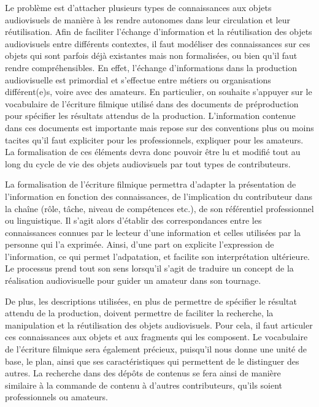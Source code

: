  Le problème est d'attacher plusieurs types de connaissances aux objets audiovisuels de manière à les rendre autonomes dans leur circulation et leur réutilisation. 
Afin de faciliter l'échange d'information et la réutilisation des objets audiovisuels entre différents contextes, il faut modéliser des connaissances sur ces objets qui sont parfois déjà existantes mais non formalisées, ou bien qu'il faut rendre compréhensibles.
En effet, l'échange d'informations dans la production audiovisuelle est primordial et s'effectue entre métiers ou organisations différent(e)s, voire avec des amateurs. 
En particulier, on souhaite s'appuyer sur le vocabulaire de l'écriture filmique utilisé dans des documents de préproduction pour spécifier les résultats attendus de la production.
L'information contenue dans ces documents est importante mais repose sur des conventions plus ou moins tacites qu'il faut expliciter pour les professionnels, expliquer pour les amateurs.
La formalisation de ces éléments devra donc pouvoir être lu et modifié tout au long du cycle de vie des objets audiovisuels par tout types de contributeurs.

La formalisation de l'écriture filmique permettra d'adapter la présentation de l'information en fonction des connaissances, de l'implication du contributeur dans la chaîne (rôle, tâche, niveau de compétences etc.), de son référentiel professionnel ou linguistique. 
Il s'agit alors d'établir des correspondances entre les connaissances connues par le lecteur d'une information et celles utilisées par la personne qui l'a exprimée.
Ainsi, d'une part on explicite l'expression de l'information, ce qui permet l'adpatation, et facilite son interprétation ultérieure.
Le processus prend tout son sens lorsqu'il s'agit de traduire un concept de la réalisation audiovisuelle pour guider un amateur dans son tournage.


De plus, les descriptions utilisées, en plus de permettre de spécifier le résultat attendu de la production, doivent permettre de faciliter la recherche, la manipulation et la réutilisation des objets audiovisuels.
Pour cela, il faut articuler ces connaissances aux objets et aux fragments qui les composent. 
Le vocabulaire de l'écriture filmique sera également précieux, puisqu'il nous donne une unité de base, le plan, ainsi que ses caractéristiques qui permettent de le distinguer des autres. 
La recherche dans des dépôts de contenus se fera ainsi de manière similaire à la commande de contenu à d'autres contributeurs, qu'ils soient professionnels ou amateurs.



